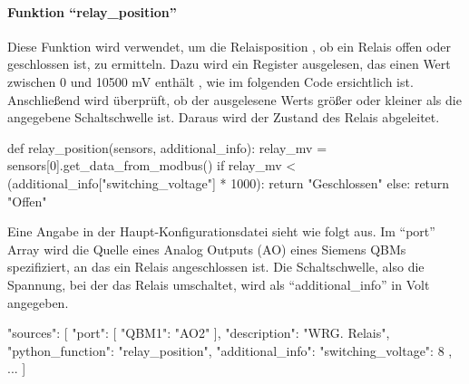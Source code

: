 \paragraph{Funktion \enquote{relay\_position}}
Diese Funktion wird verwendet, um die Relaisposition \bzw, ob ein Relais offen oder geschlossen ist, zu ermitteln. Dazu wird ein Register ausgelesen, das einen Wert zwischen 0 und 10500 mV enthält \cite[vgl.][17]{siemens:2021}, wie im folgenden Code ersichtlich ist. Anschließend wird überprüft, ob der ausgelesene Werts größer oder kleiner als die angegebene Schaltschwelle ist. Daraus wird der Zustand des Relais abgeleitet.

\begin{pythoncode}
def relay_position(sensors, additional_info):
	relay_mv = sensors[0].get_data_from_modbus()
	if relay_mv < (additional_info["switching_voltage"] * 1000):
		return "Geschlossen"
	else:
		return "Offen"

\end{pythoncode}

Eine Angabe in der Haupt-Konfigurationsdatei sieht wie folgt aus. Im \enquote{port} Array wird die Quelle eines Analog Outputs (AO) eines Siemens QBMs spezifiziert, an das ein Relais angeschlossen ist. Die Schaltschwelle, also die Spannung, bei der das Relais umschaltet, wird als \enquote{additional\_info} in Volt angegeben.

\begin{jsoncode}
"sources": [
	{
		"port": [
			{"QBM1": "AO2"}
		],
		"description": "WRG. Relais",
		"python_function": "relay_position",
		"additional_info": {"switching_voltage": 8}
	},
	...
]
\end{jsoncode}